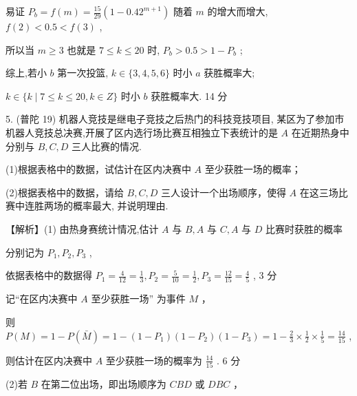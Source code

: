 \documentclass[10pt]{article}
\begin{document}
易证 \({P}_{b} = f\left( m\right)  = \frac{15}{29}\left( {1 - {0.42}^{m + 1}}\right)\) 随着 \(m\) 的增大而增大, \(f\left( 2\right)  < {0.5} < f\left( 3\right)\) ,

所以当 \(m \geq  3\) 也就是 \(7 \leq  k \leq  {20}\) 时, \({P}_{b} > {0.5} > 1 - {P}_{b}\) ;

综上,若小 \(b\) 第一次投篮, \(k \in  \{ 3,4,5,6\}\) 时小 \(a\) 获胜概率大;

\(k \in  \{ k \mid  7 \leq  k \leq  {20},k \in  Z\}\) 时小 \(b\) 获胜概率大. 14 分

5. (普陀 19) 机器人竞技是继电子竞技之后热门的科技竞技项目, 某区为了参加市机器人竞技总决赛,开展了区内选行场比赛互相独立下表统计的是 \(A\) 在近期热身中分别与 \(B,C,D\) 三人比赛的情况.

\begin{center}
\end{center}

(1)根据表格中的数据，试估计在区内决赛中 \(A\) 至少获胜一场的概率；

(2)根据表格中的数据，请给 \(B,C,D\) 三人设计一个出场顺序，使得 \(A\) 在这三场比赛中连胜两场的概率最大, 并说明理由.

【解析】(1) 由热身赛统计情况,估计 \(A\) 与 \(B,A\) 与 \(C,A\) 与 \(D\) 比赛时获胜的概率

分别记为 \({P}_{1},{P}_{2},{P}_{3}\) ,

依据表格中的数据得 \({P}_{1} = \frac{4}{12} = \frac{1}{3},{P}_{2} = \frac{5}{10} = \frac{1}{2},{P}_{3} = \frac{12}{15} = \frac{4}{5}\) , 3 分

记“在区内决赛中 \(A\) 至少获胜一场” 为事件 \(M\) ，

则 \(P\left( M\right)  = 1 - P\left( \bar{M}\right)  = 1 - \left( {1 - {P}_{1}}\right) \left( {1 - {P}_{2}}\right) \left( {1 - {P}_{3}}\right)  = 1 - \frac{2}{3} \times  \frac{1}{2} \times  \frac{1}{5} = \frac{14}{15}\) ,

则估计在区内决赛中 \(A\) 至少获胜一场的概率为 \(\frac{14}{15}\) . 6 分

(2)若 \(B\) 在第二位出场，即出场顺序为 \({CBD}\) 或 \({DBC}\) ，
\end{document}
